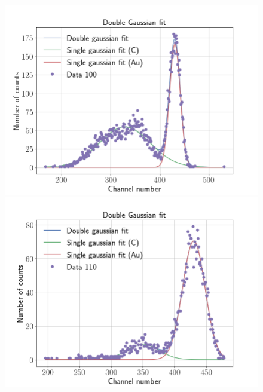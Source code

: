 \begin{figure}
\includegraphics[width=0.99\columnwidth]{Data_100}
\includegraphics[width=0.99\columnwidth]{Data_110}
\end{figure}

